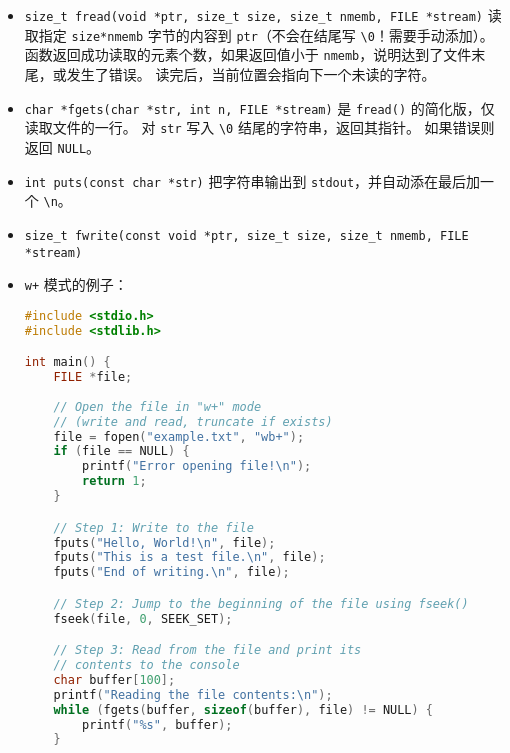 \begin{itemize}
\begin{lstlisting}[language=cpp]
    // Read the bytes from start_ind
    size_t bytesRead = fread(buffer, sizeof(char), length, file);

    // Null-terminate the buffer if any data was read
    if (bytesRead > 0)
        buffer[bytesRead] = '\0';

    // Check if we reached EOF
    if (feof(file))
        printf("End of file reached.\n");
    // Check for read errors
    else if (ferror(file))
        perror("Error reading file");

    // Print the string
    printf("Read string: %s\n", buffer);

    // Free the allocated memory and close the file
    free(buffer);
    fclose(file);

    return 0;
}
\end{lstlisting}
\item \verb`size_t fread(void *ptr, size_t size, size_t nmemb, FILE *stream)` 读取指定 \verb`size*nmemb` 字节的内容到 \verb`ptr`（不会在结尾写 \verb`\0`！需要手动添加）。 函数返回成功读取的元素个数，如果返回值小于 \verb`nmemb`，说明达到了文件末尾，或发生了错误。 读完后，当前位置会指向下一个未读的字符。
\item \verb`char *fgets(char *str, int n, FILE *stream)` 是 \verb`fread()` 的简化版，仅读取文件的一行。 对 \verb`str` 写入 \verb`\0` 结尾的字符串，返回其指针。 如果错误则返回 \verb`NULL`。
\item \verb`int puts(const char *str)` 把字符串输出到 \verb`stdout`，并自动添在最后加一个 \verb`\n`。
\item \verb`size_t fwrite(const void *ptr, size_t size, size_t nmemb, FILE *stream)`
\item \verb`w+` 模式的例子：
\begin{lstlisting}[language=cpp]
#include <stdio.h>
#include <stdlib.h>

int main() {
    FILE *file;
    
    // Open the file in "w+" mode
    // (write and read, truncate if exists)
    file = fopen("example.txt", "wb+");
    if (file == NULL) {
        printf("Error opening file!\n");
        return 1;
    }

    // Step 1: Write to the file
    fputs("Hello, World!\n", file);
    fputs("This is a test file.\n", file);
    fputs("End of writing.\n", file);

    // Step 2: Jump to the beginning of the file using fseek()
    fseek(file, 0, SEEK_SET);

    // Step 3: Read from the file and print its
    // contents to the console
    char buffer[100];
    printf("Reading the file contents:\n");
    while (fgets(buffer, sizeof(buffer), file) != NULL) {
        printf("%s", buffer);
    }


\end{lstlisting}
\end{itemize}

